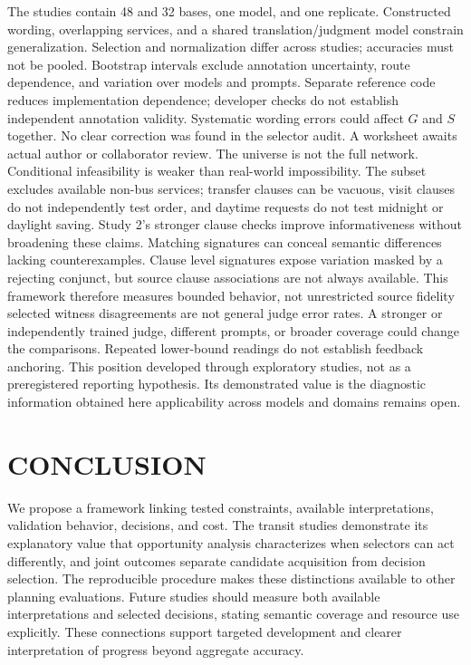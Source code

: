 \documentclass[a4paper,twoside]{article}
\begin{document}
\noindent The studies contain 48 and 32 bases, one model, and one replicate. Constructed wording, overlapping services, and a shared translation/judgment model constrain generalization. Selection and normalization differ across studies; accuracies must not be pooled. Bootstrap intervals exclude annotation uncertainty, route dependence, and variation over models and prompts.
Separate reference code reduces implementation dependence; developer checks do not establish independent annotation validity. Systematic wording errors could affect $G$ and $S$ together. No clear correction was found in the selector audit. A worksheet awaits actual author or collaborator review.
The universe is not the full network. Conditional infeasibility is weaker than real-world impossibility. The subset excludes available non-bus services; transfer clauses can be vacuous, visit clauses do not independently test order, and daytime requests do not test midnight or daylight saving. Study 2's stronger clause checks improve informativeness without broadening these claims.
Matching signatures can conceal semantic differences lacking counterexamples. Clause level signatures expose variation masked by a rejecting conjunct, but source clause associations are not always available. This framework therefore measures bounded behavior, not unrestricted source fidelity  selected witness disagreements are not general judge error rates.
A stronger or independently trained judge, different prompts, or broader coverage could change the comparisons. Repeated lower-bound readings do not establish feedback anchoring. This position developed through exploratory studies, not as a preregistered reporting hypothesis. Its demonstrated value is the diagnostic information obtained here applicability across models and domains remains open.



\section{\uppercase{Conclusion}}
\label{sec:conclusion}

\noindent We propose a framework linking tested constraints, available interpretations, validation behavior, decisions, and cost. The transit studies demonstrate its explanatory value that opportunity analysis characterizes when selectors can act differently, and joint outcomes separate candidate acquisition from decision selection. The reproducible procedure makes these distinctions available to other planning evaluations. Future studies should measure both available interpretations and selected decisions, stating semantic coverage and resource use explicitly. These connections support targeted development and clearer interpretation of progress beyond aggregate accuracy.
\end{document}
